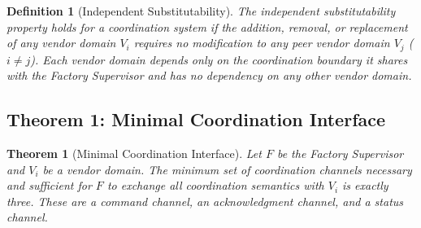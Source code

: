 \documentclass[a4paper,fleqn]{cas-dc}
\newtheorem{theorem}{Theorem}
\newtheorem{definition}{Definition}
\begin{document}
\begin{definition}[Independent Substitutability]
The independent substitutability property holds for a coordination system if the addition, removal, or replacement of any vendor domain $V_i$ requires no modification to any peer vendor domain $V_j$ ($i \neq j$). Each vendor domain depends only on the coordination boundary it shares with the Factory Supervisor and has no dependency on any other vendor domain.
\end{definition}

\subsection{Theorem 1: Minimal Coordination Interface}

\begin{theorem}[Minimal Coordination Interface]
\label{thm:minimal}
Let $F$ be the Factory Supervisor and $V_i$ be a vendor domain. The minimum set of coordination channels necessary and sufficient for $F$ to exchange all coordination semantics with $V_i$ is exactly three. These are a command channel, an acknowledgment channel, and a status channel.
\end{theorem}
\end{document}

